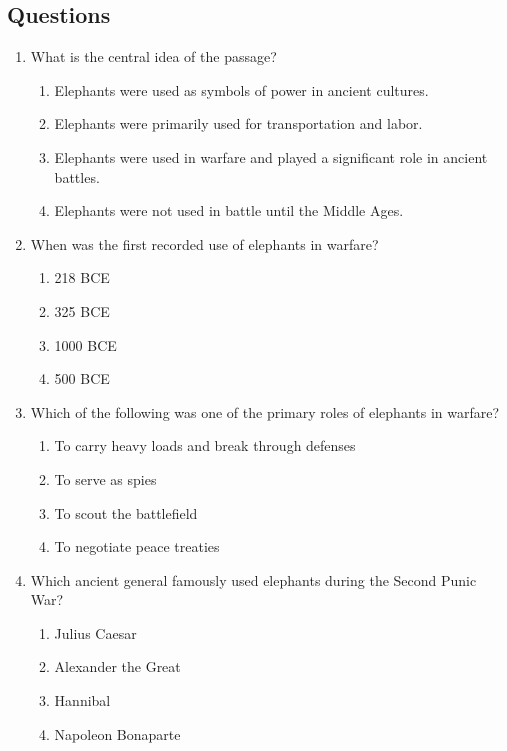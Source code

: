 \documentclass[12pt]{article}
\begin{document}
\subsection*{Questions}

\begin{enumerate}

    \item What is the central idea of the passage?
    \begin{enumerate}[label=\Alph*.]
        \item Elephants were used as symbols of power in ancient cultures.
        \item Elephants were primarily used for transportation and labor.
        \item Elephants were used in warfare and played a significant role in ancient battles.
        \item Elephants were not used in battle until the Middle Ages.
    \end{enumerate}
    \vspace{0.5cm}

    \item When was the first recorded use of elephants in warfare?
    \begin{enumerate}[label=\Alph*.]
        \item 218 BCE
        \item 325 BCE
        \item 1000 BCE
        \item 500 BCE
    \end{enumerate}
    \vspace{0.5cm}

    \item Which of the following was one of the primary roles of elephants in warfare?
    \begin{enumerate}[label=\Alph*.]
        \item To carry heavy loads and break through defenses
        \item To serve as spies
        \item To scout the battlefield
        \item To negotiate peace treaties
    \end{enumerate}
    \vspace{0.5cm}

    \item Which ancient general famously used elephants during the Second Punic War?
    \begin{enumerate}[label=\Alph*.]
        \item Julius Caesar
        \item Alexander the Great
        \item Hannibal
        \item Napoleon Bonaparte
    \end{enumerate}
    \vspace{0.5cm}


\end{enumerate}
\end{document}
